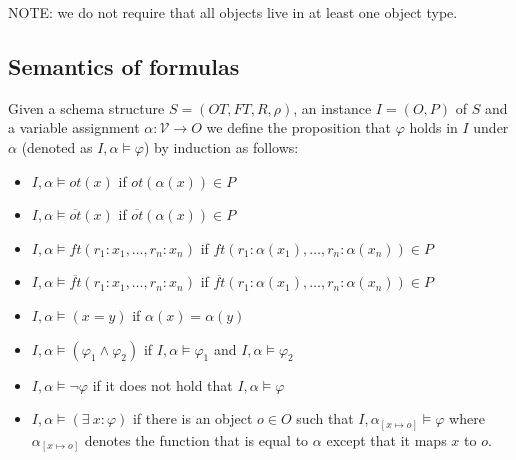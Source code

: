 \documentclass[11pt]{amsart}
\begin{document}
NOTE: we do not require that all objects live in at least one object type.


\subsection{Semantics of formulas} Given a schema  structure $S = (OT, FT, R, \rho)$, an instance $I = (O, P)$ of $S$ and a variable assignment $\alpha : \mathcal{V} \to O$ we define the proposition that $\varphi$ holds in $I$ under $\alpha$ (denoted as $I, \alpha \models \varphi$) by induction as follows:
\begin{itemize}
  \item $I, \alpha \models ot(x)$ if $ot(\alpha(x)) \in P$
  \item $I, \alpha \models \overline{ot}(x)$ if $\overline{ot}(\alpha(x)) \in P$
  \item $I, \alpha \models ft(r_1:x_1, \ldots, r_n:x_n)$ if $ft(r_1 : \alpha(x_1), \ldots, r_n : \alpha(x_n)) \in P$
  \item $I, \alpha \models \overline{ft}(r_1:x_1, \ldots, r_n:x_n)$ if $\overline{ft}(r_1 : \alpha(x_1), \ldots, r_n : \alpha(x_n)) \in P$  
  \item $I, \alpha \models (x = y)$ if $\alpha(x) = \alpha(y)$   
  \item $I, \alpha \models (\varphi_1 \wedge \varphi_2)$ if $I, \alpha \models \varphi_1$ and $I, \alpha \models \varphi_2$
  \item $I, \alpha \models \neg\varphi$ if it does not hold that  $I, \alpha \models \varphi$
  \item $I, \alpha \models (\exists\  x : \varphi)$ if there is an object $o \in O$ such that $I, \alpha_{[x \mapsto o]} \models \varphi$ where $\alpha_{[x \mapsto o]}$ denotes the function that is equal to $\alpha$ except that it maps $x$ to $o$.
\end{itemize}
\end{document}
